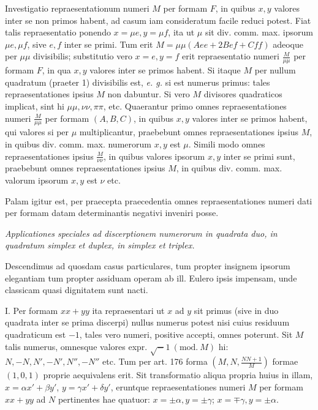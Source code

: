 Investigatio repraesentationum numeri $M$ per formam $F$, in quibus $x,y$ valores inter se non primos habent, ad casum iam consideratum facile reduci potest. Fiat talis repraesentatio ponendo $x=\mu e,y=\mu f$, ita ut $\mu$ sit div. comm. max. ipsorum $\mu e,\mu f$, sive $e,f$ inter se primi. Tum erit $M=\mu\mu(Aee+2Bef+Cff)$ adeoque per $\mu\mu$ divisibilis; substitutio vero $x=e,y=f$ erit repraesentatio numeri $\frac{M}{\mu\mu}$ per formam $F$, in qua $x,y$ valores inter se primos habent. Si itaque $M$ per nullum quadratum (praeter 1) divisibilis est, \textit{e. g.} si est numerus primus: tales repraesentationes ipsius $M$ non dabuntur. Si vero $M$ divisores quadraticos implicat, sint hi $\mu\mu,\nu\nu,\pi\pi$, etc. Quaerantur primo omnes repraesentationes numeri $\frac{M}{\mu\mu}$ per formam $(A,B,C)$, in quibus $x,y$ valores inter se primos habent, qui valores si per $\mu$ multiplicantur, praebebunt omnes repraesentationes ipsius $M$, in quibus div. comm. max. numerorum $x,y$ est $\mu$. Simili modo omnes repraesentationes ipsius $\frac{M}{\nu\nu}$, in quibus valores ipsorum $x,y$ inter se primi sunt, praebebunt omnes repraesentationes ipsius $M$, in quibus div. comm. max. valorum ipsorum $x,y$ est $\nu$ etc.

Palam igitur est, per praecepta praecedentia omnes repraesentationes numeri dati per formam datam determinantis negativi inveniri posse.

\begin{center}
\textit{Applicationes speciales ad discerptionem numerorum in quadrata duo, in quadratum simplex et duplex, in simplex et triplex.}
\end{center}

Descendimus ad quosdam casus particulares, tum propter insignem ipsorum elegantiam tum propter assiduam operam ab ill. Eulero ipsis impensam, unde classicam quasi dignitatem sunt nacti.

I. Per formam $xx+yy$ ita repraesentari ut $x$ ad $y$ sit primus (sive in
duo quadrata inter se prima discerpi) nullus numerus potest nisi cuius residuum quadraticum est $-1$, tales vero numeri, positive accepti, omnes poterunt. Sit $M$ talis numerus, omnesque valores expr. $\surd-1\ (\mathrm{mod.}\ M)$ hi: $N,-N,N',-N',N'',-N''$ etc. Tum per art. 176 forma $(M,N,\frac{NN+1}{M})$ formae $(1,0,1)$ proprie aequivalens erit. Sit transformatio aliqua propria huius in illam, $x=\alpha x'+\beta y'$, $y=\gamma x'+\delta y'$, eruntque repraesentationes numeri $M$ per formam $xx+yy$ ad $N$ pertinentes hae quatuor: $x=\pm\alpha,y=\pm\gamma$; $x=\mp\gamma,y=\pm\alpha$.

